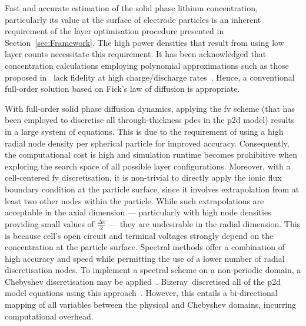 Fast  and  accurate  estimation  of   the  solid  phase  lithium  concentration,
particularly  its   value  at   the  surface  of   electrode  particles   is  an
inherent  requirement   of  the   layer  optimisation  procedure   presented  in
Section~\ref{sec:Framework}. The high power densities that result from using low
layer  counts  necessitate  this  requirement. It  has  been  acknowledged  that
concentration  calculations employing  polynomial approximations  such as  those
proposed in~\cite{Santhanagopalan2006a}  lack fidelity at  high charge/discharge
rates~\cite{Santhanagopalan2006}.  Hence,  a  conventional  full-order  solution
based on Fick's law of diffusion is appropriate.

With full-order  solid phase  diffusion dynamics,  applying the  \gls{fv} scheme
(that has  been employed to  discretise all through-thickness \gls{pde}s  in the
\gls{p2d} model)  results in  a large system  of equations. This  is due  to the
requirement  of  using  a  high  radial  node  density  per  spherical  particle
for  improved  accuracy.  Consequently,  the  computational  cost  is  high  and
simulation  runtime  becomes prohibitive  when  exploring  the search  space  of
all  possible  layer configurations.  Moreover,  with  a cell-centered  \gls{fv}
discretisation,  it is  non-trivial to  directly apply  the ionic  flux boundary
condition  at the  particle surface,  since  it involves  extrapolation from  at
least  two  other nodes  within  the  particle.  While such  extrapolations  are
acceptable  in the  axial dimension  --- particularly  with high  node densities
providing  small values  of $\frac{\Delta  x}{2}$  --- they  are undesirable  in
the  radial  dimension.  This  is  because  cell's  open  circuit  and  terminal
voltages strongly depend on the  concentration at the particle surface. Spectral
methods  offer  a  combination  of  high accuracy  and  speed  while  permitting
the  use of  a  lower number  of  radial discretisation  nodes.  To implement  a
spectral  scheme on  a non-periodic  domain, a  Chebyshev discretisation  may be
applied~\cite{Trefethen2000}.  Bizeray~\etal discretised  all  of the  \gls{p2d}
model equations using this approach~\cite{Bizeray2015a}. However, this entails a
bi-directional  mapping of  all  variables between  the  physical and  Chebyshev
domains, incurring computational overhead.

